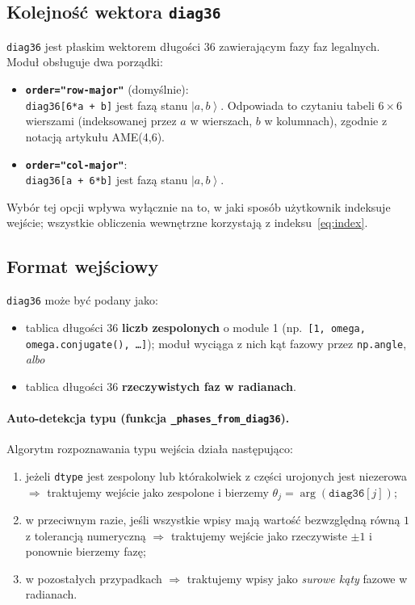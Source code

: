 \documentclass[11pt,a4paper]{article}
\newcommand{\1}{\mathbf{1}}
\newcommand{\ket}[1]{\left|#1\right\rangle}
\newcommand{\code}[1]{\texttt{#1}}
\begin{document}
\subsection{Kolejność wektora \texttt{diag36}}
\label{sec:order}

\code{diag36} jest płaskim wektorem długości 36 zawierającym fazy faz
legalnych. Moduł obsługuje dwa porządki:
\begin{itemize}[leftmargin=*]
  \item \textbf{\code{order="row-major"}} (domyślnie): \\
        \code{diag36[6*a + b]} jest fazą stanu $\ket{a,b}$. Odpowiada
        to czytaniu tabeli $6\times6$ wierszami (indeksowanej przez
        $a$ w wierszach, $b$ w kolumnach), zgodnie z notacją artykułu
        AME(4,6).
  \item \textbf{\code{order="col-major"}}: \\
        \code{diag36[a + 6*b]} jest fazą stanu $\ket{a,b}$.
\end{itemize}
Wybór tej opcji wpływa wyłącznie na to, w jaki sposób użytkownik
indeksuje wejście; wszystkie obliczenia wewnętrzne korzystają z
indeksu~\eqref{eq:index}.

\subsection{Format wejściowy}

\code{diag36} może być podany jako:
\begin{itemize}[leftmargin=*]
  \item tablica długości 36 \textbf{liczb zespolonych} o module 1
        (np.\ \code{[1, omega, omega.conjugate(), \dots]}); moduł
        wyciąga z nich kąt fazowy przez \code{np.angle}, \emph{albo}
  \item tablica długości 36 \textbf{rzeczywistych faz w radianach}.
\end{itemize}

\paragraph{Auto-detekcja typu (funkcja \code{\_phases\_from\_diag36}).}
Algorytm rozpoznawania typu wejścia działa następująco:
\begin{enumerate}[leftmargin=*]
  \item jeżeli \code{dtype} jest zespolony lub którakolwiek z części
        urojonych jest niezerowa $\Rightarrow$ traktujemy wejście jako
        zespolone i bierzemy $\theta_{j}=\arg(\code{diag36}[j])$;
  \item w przeciwnym razie, jeśli wszystkie wpisy mają wartość
        bezwzględną równą $1$ z tolerancją numeryczną
        $\Rightarrow$ traktujemy wejście jako rzeczywiste $\pm 1$
        i ponownie bierzemy fazę;
  \item w pozostałych przypadkach $\Rightarrow$ traktujemy wpisy jako
        \emph{surowe kąty} fazowe w radianach.
\end{enumerate}
\end{document}
